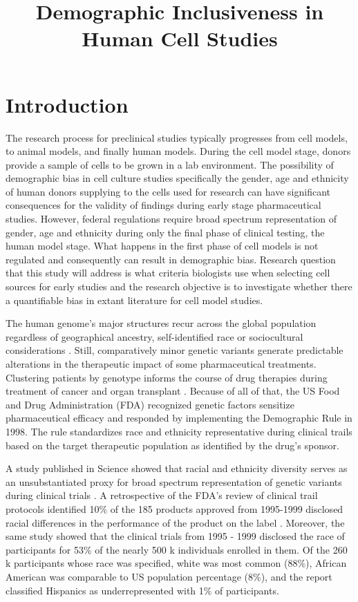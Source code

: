 \documentclass[10pt]{article}
\title{Demographic Inclusiveness in Human Cell Studies}
\begin{document}
\maketitle
  
\section{Introduction}
  
The research process for preclinical studies typically progresses from cell models, to animal models, and finally human models. During the cell model stage, donors provide a sample of cells to be grown in a lab environment. The possibility of demographic bias in cell culture studies specifically the gender, age and ethnicity of human donors supplying to the cells used for research can have significant consequences for the validity of findings during early stage pharmaceutical studies. However, federal regulations require broad spectrum representation of gender, age and ethnicity during only the final phase of clinical testing, the human model stage. What happens in the first phase of cell models is not regulated and consequently can result in demographic bias. Research question that this study will address is what criteria biologists use when selecting cell sources for early studies and the research objective is to investigate whether there a quantifiable bias in extant literature for cell model studies.

The human genome's major structures recur across the global population regardless of geographical ancestry, self-identified race or sociocultural considerations \cite{xie2001molecular, cooper2003race}. Still, comparatively minor genetic variants generate predictable alterations in the therapeutic impact of some pharmaceutical treatments. Clustering patients by genotype informs the course of drug therapies during treatment of cancer and organ transplant \cite{krynetski2000genetic, higashi2002association}. Because of all of that, the US Food and Drug Administration (FDA) recognized genetic factors sensitize pharmaceutical efficacy and responded by implementing the Demographic Rule in 1998. The rule standardizes race and ethnicity representative during clinical trails based on the target therapeutic population as identified by the drug's sponsor. 

A study published in Science showed that racial and ethnicity diversity serves as an unsubstantiated proxy for broad spectrum representation of genetic variants during clinical trials \cite{haga2003fda}. A retrospective of the FDA's review of clinical trail protocols identified 10\% of the 185 products approved from 1995-1999 disclosed racial differences in the performance of the product on the label \cite{evelyn2001participation}. Moreover, the same study showed that the clinical trials from 1995 - 1999 disclosed the race of participants for 53\% of the nearly 500 k individuals enrolled in  them. Of the 260 k participants whose race was specified, white was most common (88\%), African American was comparable to US population percentage (8\%), and the report classified Hispanics as underrepresented with 1\% of participants.
\end{document}
